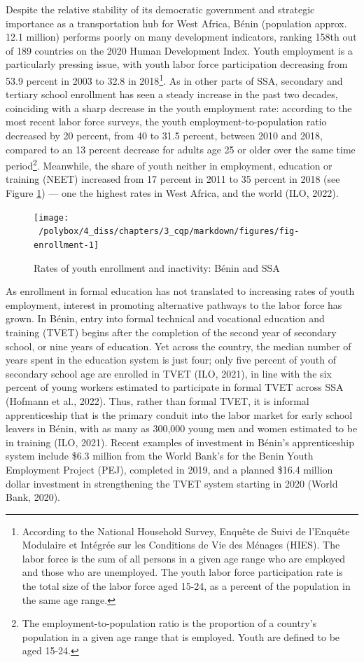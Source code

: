 \documentclass[
  11pt,
a4paper
]{report}
\begin{document}
Despite the relative stability of its democratic government and strategic importance as a transportation hub for West Africa, Bénin (population approx. 12.1 million) performs poorly on many development indicators, ranking 158th out of 189 countries on the 2020 Human Development Index. Youth employment is a particularly pressing issue, with youth labor force participation decreasing from 53.9 percent in 2003 to 32.8 in 2018\footnote{According to the National Household Survey, Enquête de Suivi de l'Enquête Modulaire et Intégrée sur les Conditions de Vie des Ménages (HIES). The labor force is the sum of all persons in a given age range who are employed and those who are unemployed. The youth labor force participation rate is the total size of the labor force aged 15-24, as a percent of the population in the same age range.}. As in other parts of SSA, secondary and tertiary school enrollment has seen a steady increase in the past two decades, coinciding with a sharp decrease in the youth employment rate: according to the most recent labor force surveys, the youth employment-to-population ratio decreased by 20 percent, from 40 to 31.5 percent, between 2010 and 2018, compared to an 13 percent decrease for adults age 25 or older over the same time period\footnote{The employment-to-population ratio is the proportion of a country's population in a given age range that is employed. Youth are defined to be aged 15-24.}. Meanwhile, the share of youth neither in employment, education or training (NEET) increased from 17 percent in 2011 to 35 percent in 2018 (see Figure \ref{fig:fig-enrollment}) --- one the highest rates in West Africa, and the world (ILO, 2022).

\begin{figure}[H]
\texttt{[image: ~/polybox/4\_diss/chapters/3\_cqp/markdown/figures/fig-enrollment-1]} \caption{Rates of youth enrollment and inactivity: Bénin and SSA}\label{fig:fig-enrollment}
\end{figure}

As enrollment in formal education has not translated to increasing rates of youth employment, interest in promoting alternative pathways to the labor force has grown. In Bénin, entry into formal technical and vocational education and training (TVET) begins after the completion of the second year of secondary school, or nine years of education. Yet across the country, the median number of years spent in the education system is just four; only five percent of youth of secondary school age are enrolled in TVET (ILO, 2021), in line with the six percent of young workers estimated to participate in formal TVET across SSA (Hofmann et al., 2022). Thus, rather than formal TVET, it is informal apprenticeship that is the primary conduit into the labor market for early school leavers in Bénin, with as many as 300,000 young men and women estimated to be in training (ILO, 2021). Recent examples of investment in Bénin's apprenticeship system include \$6.3 million from the World Bank's for the Benin Youth Employment Project (PEJ), completed in 2019, and a planned \$16.4 million dollar investment in strengthening the TVET system starting in 2020 (World Bank, 2020).
\end{document}

